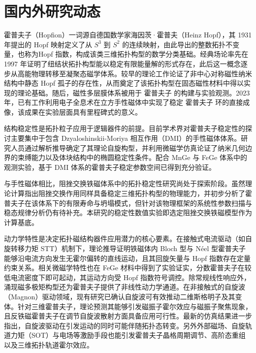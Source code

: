 \section{国内外研究动态}

霍普夫子（Hopfion）一词源自德国数学家海因茨·霍普夫（Heinz Hopf），其 1931 年提出的 Hopf 映射\cite{hopf1931abbildungen}定义了从 $S^3$ 到 $S^2$ 的连续映射，由此导出的整数拓扑不变量，也称为Hopf 指数，构成该类三维拓扑构型的数学分类基础。经典场论率先在 1997 年证明了纽结状拓扑构型能以稳定有限能量解的形式存在\cite{faddeev1997knots}，此后这一概念逐步从高能物理转移至凝聚态磁学体系。较早的理论工作论证了非中心对称磁性纳米结构中静态 Hopf 孤子的存在性\cite{tai2018static}，从而奠定了该拓扑构型在固态磁性材料中得以实现的理论基础。随后，磁性多层膜体系被用于 霍普夫子 的构建与实验观测\cite{kent2021creation}。2023 年，已有工作利用电子全息术在立方手性磁体中实现了稳定 霍普夫子 环的直接成像\cite{zheng2023hopfion}，该成果在实验层面具有里程碑式的意义。

结构稳定性是拓扑粒子应用于逻辑器件的前提。目前学术界对霍普夫子稳定性的探讨主要集中于包含 Dzyaloshinskii-Moriya 相互作用（DMI）的手性磁体体系\cite{guslienko2024review}。研究人员通过解析推导确定了其理论自旋构型\cite{sutcliffe2018hopfions}，并利用微磁学仿真论证了纳米几何边界的束缚能力\cite{liu2018binding}以及体块结构中的椭圆稳定性条件\cite{metlov2025elliptical}。配合 MnGe 与 FeGe 体系中的观测实验\cite{zheng2023hopfion,yu2023realization}，基于 DMI 体系的霍普夫子稳定参数空间已得到充分验证。

与手性磁体相比，阻挫交换铁磁体系中的拓扑稳定性研究尚处于探索阶段。虽然理论计算指出阻挫交换作用同样具备稳定三维拓扑构型的物理能力\cite{sallermann2023stability}，并初步分析了霍普夫子在该体系下的有限寿命与坍塌模式\cite{lobanov2023lifetime}，但针对该物理框架的系统性参数扫描与稳态规律分析仍有待补充。本研究的稳定性数值实验即选定阻挫交换铁磁模型作为计算基底。

动力学特性是决定拓扑磁结构器件应用潜力的核心要素。在接触式电流驱动（如自旋转移力矩 STT）机制下，理论推导证明铁磁体内 Bloch 型与 N\'{e}el 型霍普夫子能够沿电流方向发生无霍尔偏转的直线运动\cite{wang2019current}，且其回旋矢量与 Hopf 指数存在定量约束关系\cite{liu2020three}。相关微磁学特性也在 FeGe 材料中得到了实验证实，分数霍普夫子在较低电流密度下即可起动，其运动方向受 Hopf 指数符号调控\cite{yu2023realization}。除常规线性响应外，涌现磁多极矩构型还为霍普夫子提供了非线性动力学通道\cite{liu2022emergent}。在非接触式的自旋波（Magnon）驱动领域，现有研究已确认自旋波可有效推动二维斯格明子及其变体\cite{ding2015motion,huang2023transient,shen2018skyrmionium}。针对三维霍普夫子，理论预测其能够引发磁振子霍尔效应与磁振子聚焦现象\cite{saji2023magnonic}，且反铁磁霍普夫子在调节自旋波散射方面具备应用可行性\cite{zhang2023magnon,pershoguba2021electronic}。最新的仿真结果进一步指出，自旋波驱动在引发运动的同时可能伴随拓扑态转变\cite{souza2025topological}。另外外部磁场、自旋轨道力矩（SOT）与电场等激励手段也能引发霍普夫子晶格周期调节\cite{metlov2025control}、高阶态重组\cite{kasai2025sot}以及三维拓扑轨道霍尔效应\cite{goebel2025orbital}。


